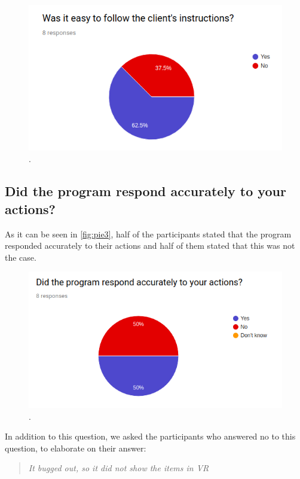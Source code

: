 \begin{figure}[H]
	\centering
	\includegraphics[width=0.9\linewidth]{figure/Evaluation/pie2.png}
	\caption{.}
	\label{fig:pie2}
\end{figure}

\subsection*{Did the program respond accurately to your actions?}
As it can be seen in \autoref{fig:pie3}, half of the participants stated that the program responded accurately to their actions and half of them stated that this was not the case.

\begin{figure}[H]
	\centering
	\includegraphics[width=0.9\linewidth]{figure/Evaluation/pie3.png}
	\caption{.}
	\label{fig:pie3}
\end{figure}

In addition to this question, we asked the participants who answered no to this question, to elaborate on their answer:\\

\begin{quote}
	\textit{It bugged out, so it did not show the items in VR}\\
\end{quote}

